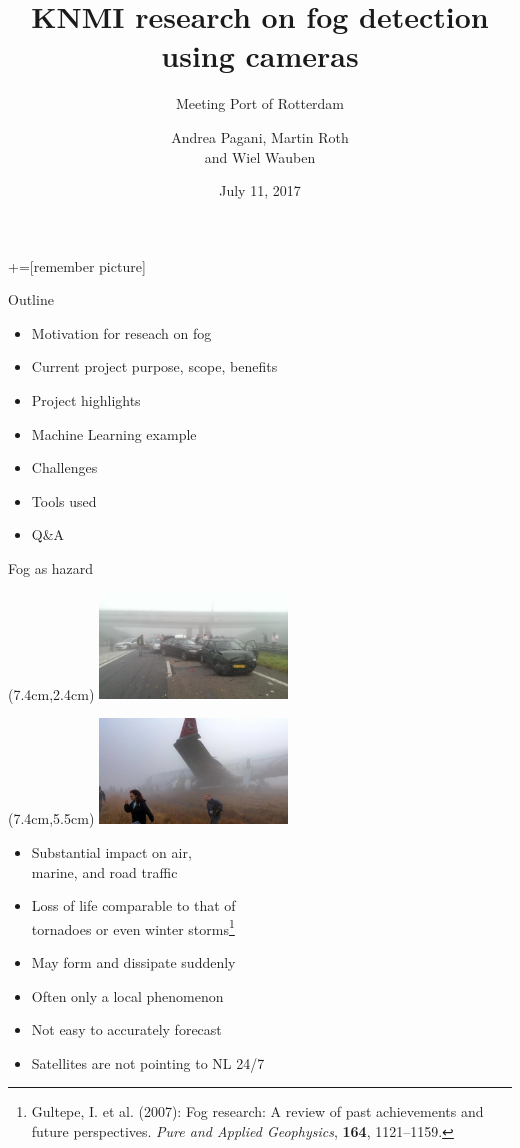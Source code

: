 \documentclass[10pt,fleqn]{beamer}\usepackage[]{graphicx}\usepackage[]{color}
\title[Fog detection]{KNMI research on fog detection using cameras}
\subtitle{Meeting Port of Rotterdam}
\date{July 11, 2017}
\author[Pagani, Roth, Wauben]{Andrea Pagani, Martin Roth\\ and Wiel Wauben}
\begin{document}
+=[remember picture]




\begin{frame}
 \titlepage
\end{frame}

 \begin{frame}{Outline}
  \begin{itemize}
   \item Motivation for reseach on fog
   \item Current project purpose, scope, benefits
   \item Project highlights
   \item Machine Learning example
   \item Challenges
   \item Tools used
   \item Q\&A
 \end{itemize}
 \end{frame}




\begin{frame}{Fog as hazard}
 \begin{textblock*}{5cm}(7.4cm,2.4cm)
  \includegraphics[width=5cm]{Accident.jpeg}
 \end{textblock*}
 \begin{textblock*}{5cm}(7.4cm,5.5cm)
  \includegraphics[width=5cm]{airplane.jpg}
 \end{textblock*}
\begin{itemize}
  \item Substantial impact on air,\\ marine, and road traffic
  \item Loss of life comparable to that of\\ tornadoes or even winter storms\footnote{Gultepe, I. et al. (2007): Fog research: A review of past achievements and future perspectives. \emph{Pure and Applied Geophysics}, \textbf{164}, 1121--1159.}
  \item May form and dissipate suddenly
  \item Often only a local phenomenon
  \item Not easy to accurately forecast
  \item Satellites are not pointing to NL 24/7
 \end{itemize}
\end{frame}
\end{document}
